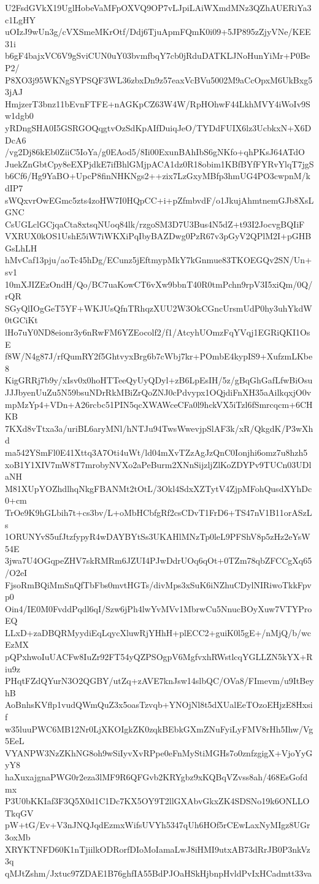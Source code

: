 U2FsdGVkX19UglHobeVaMFpOXVQ9OP7vLJpiLAiWXmdMNz3QZhAUERiYa3c1LgHY
uOIzJ9wUn3g/cVXSmeMKrOtf/Ddj6TjuApmFQmK0i09+5JP895zZjyVNe/KEE31i
b6gF4bajxVC6V9gSviCUN0uY03bvmfbqY7cb0jRduDATKLJNoHunYiMr+P0BeP2/
P8XO3j95WKNgSYPSQF3WL36zbxDn9z57eaxVcBVu5002M9aCcOpxM6UkBxg53jAJ
HmjzerT3bnz11bEvnFTFE+nAGKpCZ63W4W/RpHOhwF44LkhMVY4iWoIv9Sw1dgb0
yRDngSHA0I5GSRGOQqgtvOzSdKpAIfDuiqJeO/TYDdFUIX6lz3UcbkxN+X6DDcA6
/vg2Dj86kEb0ZiiC5IoYa/g0EAod5/8Ii00ExunBAhIbS6gNKfo+qhPKsJ64ATdO
JuekZnGbtCpy8eEXPjdkE7ifBhlGMjpACA1dz0R18obim1KBfBYfFYRvYlqT7jgS
b6Cf6/Hg9YaBO+UpcP8finNHKNgs2++zix7LzGxyMBfp3hmUG4PO3cwpnM/kdIP7
sWQxvrOwEGmc5zts4zoHW7I0HQpCC+i+pZfmbvdF/o1JkujAhmtnemGJb8XsLGNC
CsUGLclGCjqaCta8xtsqNUoq84lk/rzgoSM3D7U3Bus4N5dZ+t93I2JocvgBQIiF
VXRUX0kOS1UshE5iW7iWKXiPqIbyBAZDwg0PzR67v3pGyV2QPlM2I+pGHBGsLhLH
hMvCaf13pju/aoTc45hDg/ECunz5jEftmypMkY7kGnmue83TKOEGQv2SN/Un+sv1
10mXJIZEzOndH/Qo/BC7uaKowCT6vXw9bbnT40R0tmPchn9rpV3I5xiQm/0Q/rQR
SGyQlIOgGeT5YF+WKJUsQfnTRhqzXUU2W3OkCGncUrsmUdP0hy3uhYkdW0tGCiKt
lHo7uY0ND8eionr3y6nRwFM6YZEocolf2/f1/AtcyhUOmzFqYVqj1EGRiQKI1OsE
f8W/N4g87J/rfQumRY2f5GhtvyxBrg6b7cWbj7kr+POmbE4kypIS9+XufzmLKbe8
KigGRRj7b9y/xIsv0x0hoHTTeeQyUyQDyl+zB6LpEsIH/5z/gBqGhGafLfwBiOsu
JJJbyenUuZu5N59bsuNDrRkMBiZrQoZNJ0cPdvypx1OQjdiFnXH35aAilkqxjO0v
mpMzYp4+VDn+A26rcbc51PIN5qcXWAWceCFa0l9hckVX5iTzl6fSmrcqcm+6CHKB
7KXd8vTtxa3a/uriBL6aryMNl/hNTJu94TwsWwevjpSlAF3k/xR/QkgdK/P3wXhd
ma542YSmFl0E41Xttq3A7Oti4uWt/ld04mXvTZzAgJzQnC0Ionjhi6omz7u8hzh5
xoB1Y1XIV7mW8T7mrobyNVXo2aPeBurm2XNnSijzljZlKoZDYPv9TUCn03UDlaNH
M81XUpYOZhdlhqNkgFBANMt2tOtL/3Okl4SdxXZTytV4ZjpMFohQusdXYhDc0+cm
TrOe9K9hGLbih7t+cs3bv/L+oMbHCbfgRf2csCDvT1FrD6+TS47nV1B11orASzLs
1ORUNYvS5ufJtzfypyR4wDAYBYtSs3UKAHlMNzTp0leL9PFShV8p5zHz2eYsW54E
3jwa7U4OGqpeZHV7skRMRm6JZUI4PJwDdrUOq6qOt+0TZm78qbZFCCgXq65/O2eI
FjsoRmBQiMmSnQfTbFbs0mvtHGTs/divMps3xSuK6iNZhuCDylNIRiwoTkkFpvp0
Oin4/IE0M0FvddPqdl6qI/Szw6jPh4lwYvMVv1MbrwCu5NnucBOyXuw7VTYProEQ
LLxD+zaDBQRMyydiEqLqycXluwRjYHhH+plECC2+guiK0l5gE+/nMjQ/b/wcEzMX
pQPxhwoIuUACFw8IuZr92FT54yQZPSOgpV6MgfvxhRWstlcqYGLLZN5kYX+Riu9z
PHqtFZdQYurN3O2QGBY/utZq+zAVE7knJsw14slbQC/OVa8/FImevm/u9ItBeyhB
AoBnhsKVflp1vudQWmQuZ3x5oasTzvqb+YNOjNl8t5dXUalEeTOzoEHjzE8Hxsif
w35luuPWC6MB12Nr0LjXKOIgkZK0zqkBEbkGXmZNuFyiLyFMV8rHh5Ihw/Vg5EeL
VYANPW3NzZKhNG8oh9wSiIyvXvRPpe0eFnMyStiMGHs7o0znfzgigX+VjoYyGyY8
haXuxajgnaPWG0r2eza3lMF9R6QFGvb2KRYgbz9xKQBqVZvss8ah/468EsGofdmx
P3U0bKKIaf3F3Q5X0d1C1Dc7KX5OY9T2llGXAbvGkxZK4SDSNo19k6ONLLOTkqGV
pW+tG/Ev+V3nJNQJqdEzmxWifsUVYh5347qUh6HOf5rCEwLaxNyMIgz8UGr3oxMb
XRYKTNFD60K1nTjiilkODRorfDIoMoIamaLwJ8iHMI9utxAB73dRrJB0P3nkVz3q
qMJtZshm/Jxtuc97ZDAE1B76ghfIA55BdPJOaHSkHjbnpHvldPvIxHCadmtt33va
